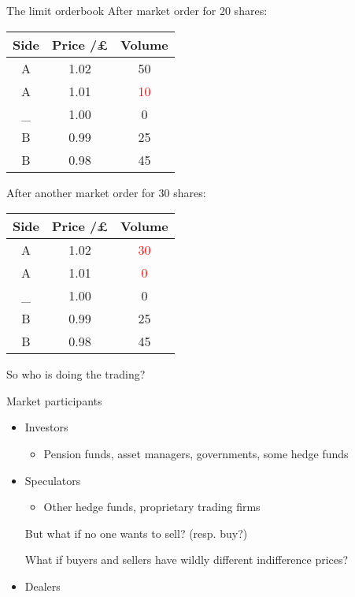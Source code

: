\documentclass{beamer} %
\begin{document}
\begin{frame}{The limit orderbook}
    After market order for 20 shares:
    \begin{center}
        \begin{tabular}{ |c|c|c| } 
            \hline
            Side & Price /£ & Volume \\ 
            \hline
            A & 1.02 & 50 \\
            A & 1.01 & \textcolor{red}{10} \\
            \_ & 1.00 & 0 \\
            B & 0.99 & 25 \\ 
            B & 0.98 & 45 \\
            \hline
        \end{tabular}
    \end{center}
    After another market order for 30 shares:
    \begin{center}
        \begin{tabular}{ |c|c|c| } 
            \hline
            Side & Price /£ & Volume \\ 
            \hline
            A & 1.02 & \textcolor{red}{30} \\
            A & 1.01 & \textcolor{red}{0} \\
            \_ & 1.00 & 0 \\
            B & 0.99 & 25 \\ 
            B & 0.98 & 45 \\
            \hline
        \end{tabular}
    \end{center}
    So who is doing the trading?
\end{frame}

\begin{frame}{Market participants}
    \begin{itemize}
        \item Investors
        \begin{itemize}
            \item Pension funds, asset managers, governments, some hedge funds
        \end{itemize}
        \item Speculators
        \begin{itemize}
            \item Other hedge funds, proprietary trading firms
        \end{itemize}
        But what if no one wants to sell? (resp. buy?)

        What if buyers and sellers have wildly different indifference prices?
        \item Dealers
    \end{itemize}
\end{frame}
\end{document}
